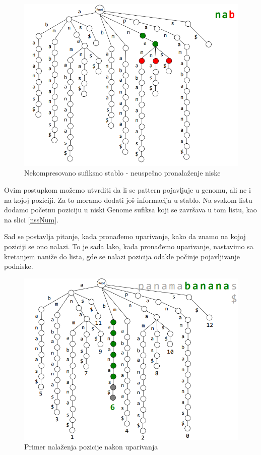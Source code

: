\begin{figure}[h!]
\centering
\includegraphics[scale=0.5]{poglavlja/9/slike/sufiksnoStabloNekompresovanoGreska.png}
\caption{Nekompresovano sufiksno stablo - neuspešno pronalaženje niske}
\label{slika:X}
\end{figure}
\fi 

Ovim postupkom možemo utvrditi da li se pattern pojavljuje u genomu, ali ne i na kojoj poziciji. Za to moramo dodati još informacija u stablo. Na svakom listu dodamo početnu poziciju u niski Genome sufiksa koji se završava u tom listu, kao na slici \ref{nssNum}.


Sad se postavlja pitanje, kada pronađemo uparivanje, kako da znamo na kojoj poziciji se ono nalazi. To je sada lako, kada pronađemo uparivanje, nastavimo sa kretanjem naniže do lista, gde se nalazi pozicija odakle počinje pojavljivanje podniske. 

\iffalse 
\begin{figure}[h!]
\centering
\includegraphics[scale=0.5]{poglavlja/9/slike/sufiksnoStabloNaciIndeksPocetka.png}
\caption{Primer nalaženja pozicije nakon uparivanja}
\label{slika:X}
\end{figure}

